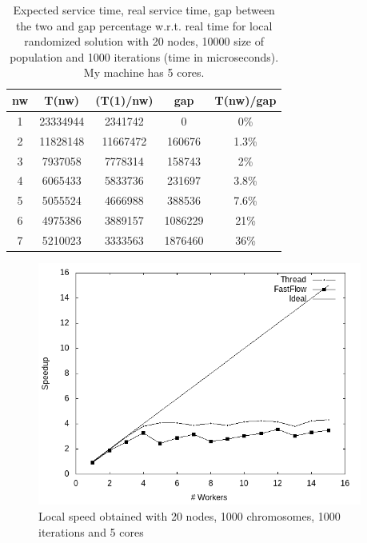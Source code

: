 \documentclass{article}
\begin{document}
        \begin{table}[h!]
            \begin{center}
                \caption{Expected service time, real service time, gap between the two  and gap percentage w.r.t. real time for local randomized solution with 20 nodes, 10000 size of population and 1000 iterations (time in microseconds). My machine has 5 cores.}
                \label{tab:table1}
                \begin{tabular}{c|c|c|c|c}
                    \textbf{nw} & \textbf{T(nw)} & \textbf{(T(1)/nw)} & \textbf{gap} & \textbf{T(nw)/gap}\\
                    \hline
                        1 & 23334944 & 2341742 & 0 & 0\%\\
                        2 & 11828148 & 11667472 & 160676 & 1.3\%\\
			3 & 7937058 & 7778314 & 158743 & 2\%\\
			4 & 6065433 & 5833736 & 231697 & 3.8\%\\
			5 & 5055524 & 4666988 & 388536 & 7.6\%\\
			6 & 4975386 & 3889157 & 1086229 & 21\%\\
			7 & 5210023 & 3333563 & 1876460 & 36\%\\
                \end{tabular}
            \end{center}
        \end{table}


    \begin{figure}
        \includegraphics[width=\linewidth, height=8cm]{img/local_speedup.png}
        \caption{Local speed obtained with 20 nodes, 1000 chromosomes, 1000 iterations and 5 cores}
        \label{fig:locals}
    \end{figure}
\end{document}
